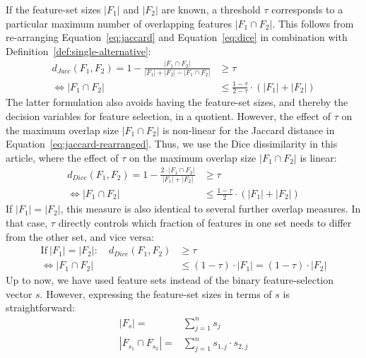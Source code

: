\documentclass{article}
\theoremstyle{definition}
\begin{document}
If the feature-set sizes $|F_1|$ and $|F_2|$ are known, a threshold $\tau$ corresponds to a particular maximum number of overlapping features $|F_1 \cap F_2|$.
This follows from re-arranging Equation~\ref{eq:jaccard} and Equation~\ref{eq:dice} in combination with Definition~\ref{def:single-alternative}:
%
\begin{equation}
	\begin{aligned}
		d_{Jacc}(F_1,F_2) = 1 - \frac{|F_1 \cap F_2|}{|F_1| + |F_2| - |F_1 \cap F_2|} &\geq \tau \\
		\Leftrightarrow |F_1 \cap F_2| &\leq \frac{1 - \tau}{2 - \tau} \cdot (|F_1| + |F_2|)
		\end{aligned}
	\label{eq:jaccard-rearranged}
\end{equation}
%
The latter formulation also avoids having the feature-set sizes, and thereby the decision variables for feature selection, in a quotient.
However, the effect of $\tau$ on the maximum overlap size $|F_1 \cap F_2|$ is non-linear for the Jaccard distance in Equation~\ref{eq:jaccard-rearranged}.
Thus, we use the Dice dissimilarity in this article, where the effect of $\tau$ on the maximum overlap size $|F_1 \cap F_2|$ is linear:
%
\begin{equation}
	\begin{aligned}
		d_{Dice}(F_1,F_2) = 1 - \frac{2 \cdot |F_1 \cap F_2|}{|F_1| + |F_2|} &\geq \tau \\
		\Leftrightarrow |F_1 \cap F_2| &\leq \frac{1 - \tau}{2} \cdot (|F_1| + |F_2|)
	\end{aligned}
	\label{eq:dice-rearranged}
\end{equation}
%
If $|F_1| = |F_2|$, this measure is also identical to several further overlap measures.
In that case, $\tau$ directly controls which fraction of features in one set needs to differ from the other set, and vice versa:
%
\begin{equation}
	\begin{aligned}
		\text{If}~|F_1| = |F_2|: \quad d_{Dice}(F_1,F_2) &\geq \tau \\
		\Leftrightarrow |F_1 \cap F_2| &\leq (1 - \tau) \cdot |F_1| = (1 - \tau) \cdot |F_2|
	\end{aligned}
\end{equation}
%
Up to now, we have used feature sets instead of the binary feature-selection vector $s$.
However, expressing the feature-set sizes in terms of $s$ is straightforward:
%
\begin{equation}
	\begin{aligned}
		|F_s| =& \sum_{j=1}^n s_j \\
		|F_{s_1} \cap F_{s_2}| =& \sum_{j=1}^n s_{1,j} \cdot s_{2,j}
	\end{aligned}
	\label{eq:feature-set-size}
\end{equation}
\end{document}
